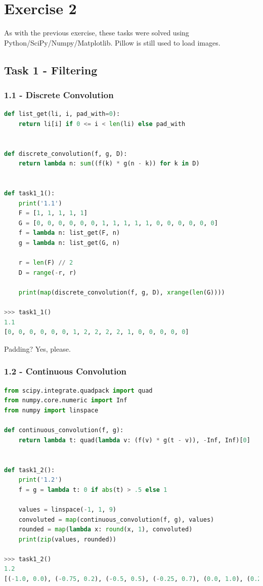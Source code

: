 \chapter{Exercise 2}

As with the previous exercise, these tasks were solved using Python/SciPy/Numpy/Matplotlib.
Pillow is still used to load images.

\section*{Task 1 - Filtering}

\subsection*{1.1 - Discrete Convolution}

\begin{lstlisting}[language=Python, label=discrete_convolution, caption=Discrete convolution - box filter]
def list_get(li, i, pad_with=0):
    return li[i] if 0 <= i < len(li) else pad_with


def discrete_convolution(f, g, D):
    return lambda n: sum((f(k) * g(n - k)) for k in D)


def task1_1():
    print('1.1')
    F = [1, 1, 1, 1, 1]
    G = [0, 0, 0, 0, 0, 0, 1, 1, 1, 1, 1, 0, 0, 0, 0, 0, 0]
    f = lambda n: list_get(F, n)
    g = lambda n: list_get(G, n)

    r = len(F) // 2
    D = range(-r, r)

    print(map(discrete_convolution(f, g, D), xrange(len(G))))

>>> task1_1()
1.1
[0, 0, 0, 0, 0, 0, 1, 2, 2, 2, 2, 1, 0, 0, 0, 0, 0]
\end{lstlisting}

Padding? Yes, please.

\newpage
\subsection*{1.2 - Continuous Convolution}

\begin{lstlisting}[language=Python, label=continous_convolution, caption=Continous convolution]
from scipy.integrate.quadpack import quad
from numpy.core.numeric import Inf
from numpy import linspace

def continuous_convolution(f, g):
    return lambda t: quad(lambda v: (f(v) * g(t - v)), -Inf, Inf)[0]


def task1_2():
    print('1.2')
    f = g = lambda t: 0 if abs(t) > .5 else 1

    values = linspace(-1, 1, 9)
    convoluted = map(continuous_convolution(f, g), values)
    rounded = map(lambda x: round(x, 1), convoluted)
    print(zip(values, rounded))

>>> task1_2()
1.2
[(-1.0, 0.0), (-0.75, 0.2), (-0.5, 0.5), (-0.25, 0.7), (0.0, 1.0), (0.25, 0.7), (0.5, 0.5), (0.75, 0.2), (1.0, 0.0)]
\end{lstlisting}

